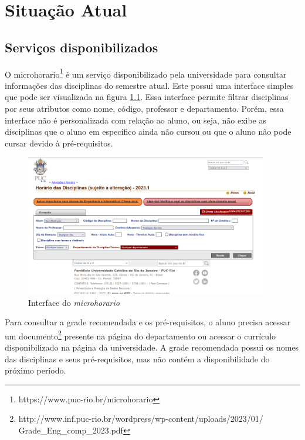 
\chapter{Situa{\c c}\~ao Atual}
\label{cha:Situa{\c c}\~ao Atual}

\section{Serviços disponibilizados}

O microhorario\footnote{https://www.puc-rio.br/microhorario} é um serviço disponibilizado pela universidade para consultar informações das disciplinas do semestre atual. Este possui uma interface simples que pode ser visualizada na figura \ref{fig:microhorario}. Essa interface permite filtrar disciplinas por seus atributos como nome, código, professor e departamento. Porém, essa interface não é personalizada com relação ao aluno, ou seja, não exibe as disciplinas que o aluno em específico ainda não cursou ou que o aluno não pode cursar devido à pré-requisitos.

\begin{figure}[h]
    \begin{center}
    \includegraphics[width=300pt]{figuras/microhorario}
    \caption{Interface do \textit{microhorario}}
    \label{fig:microhorario}
    \end{center}
\end{figure}


Para consultar a grade recomendada e os pré-requisitos, o aluno precisa acessar um documento\footnote{http://www.inf.puc-rio.br/wordpress/wp-content/uploads/2023/01/\\Grade\_Eng\_comp\_2023.pdf} presente na página do departamento ou acessar o currículo disponibilizado na página da universidade. A grade recomendada possui os nomes das disciplinas e seus pré-requisitos, mas não contém a disponibilidade do próximo período.


